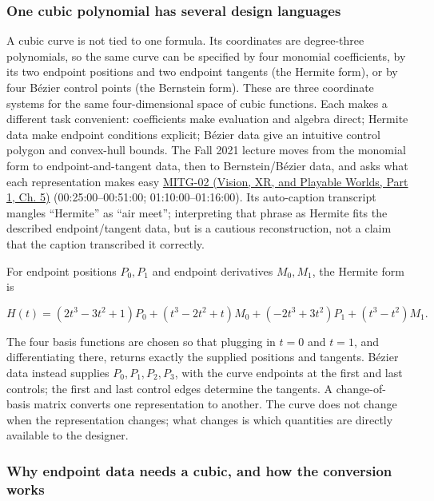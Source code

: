 \subsubsection{One cubic polynomial has several design languages}\label{03-visual-computing-i-ch001-one-cubic-polynomial-has-several-design-languages}

\hypertarget{03-visual-computing-i-ch001-one-cubic-polynomial-has-several-design-languages}{}

A cubic curve is not tied to one formula. Its coordinates are degree-three polynomials, so the same curve can be specified by four monomial coefficients, by its two endpoint positions and two endpoint tangents (the Hermite form), or by four Bézier control points (the Bernstein form). These are three coordinate systems for the same four-dimensional space of cubic functions. Each makes a different task convenient: coefficients make evaluation and algebra direct; Hermite data make endpoint conditions explicit; Bézier data give an intuitive control polygon and convex-hull bounds. The Fall 2021 lecture moves from the monomial form to endpoint-and-tangent data, then to Bernstein/Bézier data, and asks what each representation makes easy \href{../07-Vision-XR-and-Playable-Worlds-P01/main.pdf\#04-visual-computing-ii-ch036-mitg-02---cubic-curves}{MITG-02 (Vision, XR, and Playable Worlds, Part 1, Ch. 5)} (00:25:00--00:51:00; 01:10:00--01:16:00). Its auto-caption transcript mangles ``Hermite'' as ``air meet''; interpreting that phrase as Hermite fits the described endpoint/tangent data, but is a cautious reconstruction, not a claim that the caption transcribed it correctly.

For endpoint positions \(P_0,P_1\) and endpoint derivatives \(M_0,M_1\), the Hermite form is

\[
H(t)=(2t^3-3t^2+1)P_0+(t^3-2t^2+t)M_0+(-2t^3+3t^2)P_1+(t^3-t^2)M_1.
\]

The four basis functions are chosen so that plugging in \(t=0\) and \(t=1\), and differentiating there, returns exactly the supplied positions and tangents. Bézier data instead supplies \(P_0,P_1,P_2,P_3\), with the curve endpoints at the first and last controls; the first and last control edges determine the tangents. A change-of-basis matrix converts one representation to another. The curve does not change when the representation changes; what changes is which quantities are directly available to the designer.

\subsubsection{Why endpoint data needs a cubic, and how the conversion works}\label{03-visual-computing-i-ch001-why-endpoint-data-needs-a-cubic-and-how-the-conversion-works}

